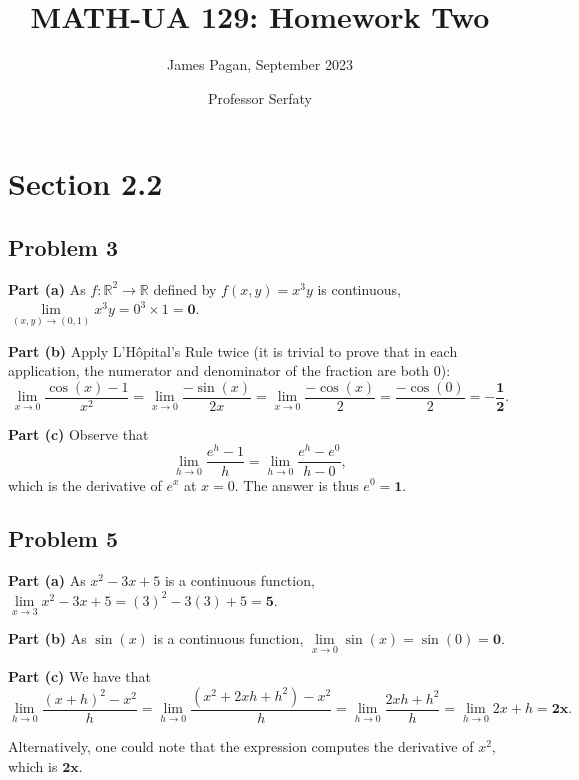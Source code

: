 \documentclass[11pt]{article}
\title{MATH-UA 129: Homework Two}
\author{James Pagan, September 2023}
\date{Professor Serfaty}
\begin{document}
\maketitle
\tableofcontents


\section{Section 2.2}

\subsection{Problem 3}

\textbf{Part (a)} As $f: \mathbb{R}^{2} \to \mathbb{R}$ defined by $f(x, y) = x^{3}y$ is continuous, $\lim\limits_{(x, y) \to (0, 1)} x^{3}y = 0^{3} \times 1 = \textbf{0}$.

\textbf{Part (b)} Apply L'Hôpital's Rule twice (it is trivial to prove that in each application, the numerator and denominator of the fraction are both $0$):
\[
	\lim\limits_{x \to 0} \frac{\cos(x) - 1}{x^{2}} = \lim\limits_{x \to 0} \frac{-\sin(x)}{2x} = \lim\limits_{x \to 0} \frac{-\cos(x)}{2} = \frac{-\cos(0)}{2} = \mathbf{- \frac{1}{2}}.
\]

\textbf{Part (c)} Observe that 
\[
	\lim\limits_{h \to 0} \frac{e^{h} - 1}{h} = \lim\limits_{h \to 0} \frac{e^{h} - e^{0}}{h - 0}, 
\]
which is the derivative of $e^{x}$ at $x = 0$. The answer is thus $e^{0} = \mathbf{1}$.


\subsection{Problem 5}

\textbf{Part (a)} As $x^{2} - 3x + 5$ is a continuous function, $\lim\limits_{x \to 3} x^{2} - 3x + 5 = (3)^{2} - 3(3) + 5 = \mathbf{5}$.

\textbf{Part (b)} As $\sin(x)$ is a continuous function, $\lim\limits_{x \to 0} \sin(x) = \sin(0) = \mathbf{0}$.

\textbf{Part (c)} We have that 
\[
	\lim\limits_{h \to 0} \frac{(x + h)^{2} - x^{2}}{h} = \lim\limits_{h \to 0} \frac{(x^{2} + 2xh + h^{2}) - x^{2}}{h} = \lim\limits_{h \to 0} \frac{2xh + h^{2}}{h} = \lim\limits_{h \to 0} 2x + h = \textbf{2x}. 
\]

Alternatively, one could note that the expression computes the derivative of $x^{2}$, which is $\textbf{2x}$.
\end{document}
